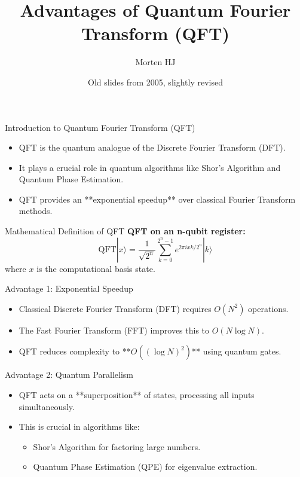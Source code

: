 \documentclass{beamer}
\title{Advantages of Quantum Fourier Transform (QFT)}
\author{Morten HJ}
\date{Old slides from 2005, slightly revised}
\begin{document}
\begin{frame}
    \titlepage
\end{frame}

\begin{frame}{Introduction to Quantum Fourier Transform (QFT)}
    \begin{itemize}
        \item QFT is the quantum analogue of the Discrete Fourier Transform (DFT).
        \item It plays a crucial role in quantum algorithms like Shor’s Algorithm and Quantum Phase Estimation.
        \item QFT provides an **exponential speedup** over classical Fourier Transform methods.
    \end{itemize}
\end{frame}

\begin{frame}{Mathematical Definition of QFT}
    \textbf{QFT on an n-qubit register:}
    \[
    \text{QFT} |x\rangle = \frac{1}{\sqrt{2^n}} \sum_{k=0}^{2^n-1} e^{2\pi i x k / 2^n} |k\rangle
    \]
    where \( x \) is the computational basis state.
\end{frame}

\begin{frame}{Advantage 1: Exponential Speedup}
    \begin{itemize}
        \item Classical Discrete Fourier Transform (DFT) requires \( O(N^2) \) operations.
        \item The Fast Fourier Transform (FFT) improves this to \( O(N \log N) \).
        \item QFT reduces complexity to **\( O((\log N)^2) \)** using quantum gates.
    \end{itemize}
\end{frame}

\begin{frame}{Advantage 2: Quantum Parallelism}
    \begin{itemize}
        \item QFT acts on a **superposition** of states, processing all inputs simultaneously.
        \item This is crucial in algorithms like:
        \begin{itemize}
            \item Shor’s Algorithm for factoring large numbers.
            \item Quantum Phase Estimation (QPE) for eigenvalue extraction.
        \end{itemize}
    \end{itemize}
\end{frame}
\end{document}
